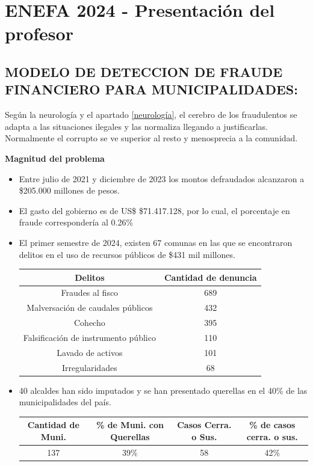 \documentclass[letter,12pt]{article}
\begin{document}
	\section{ENEFA 2024 - Presentación del profesor}
		\subsection{MODELO DE DETECCION DE FRAUDE FINANCIERO PARA MUNICIPALIDADES:}
		Según la neurología y el apartado \ref{neurología}, el cerebro de los fraudulentos se adapta a las situaciones ilegales y las normaliza llegando a justificarlas. Normalmente el corrupto se ve superior al resto y menosprecia a la comunidad.
		
		\textbf{Magnitud del problema}
		\begin{itemize}
			\item Entre julio de 2021 y diciembre de 2023 los montos defraudados  alcanzaron a \$205.000 millones de pesos.
			\item El gasto del gobierno es de US\$ \$71.417.128, por lo cual, el porcentaje en fraude correspondería al 0.26\%
			\item El primer semestre de 2024, existen 67 comunas en las que se encontraron delitos en el uso de recursos públicos de \$431 mil millones.
			\begin{center}
				\begin{tabular}{|c|c|}
					\hline
					Delitos & Cantidad de denuncia\\
					\hline
					Fraudes al fisco & 689\\
					\hline
					Malversación de caudales públicos & 432\\
					\hline
					Cohecho & 395\\
					\hline
					Falsificación de instrumento público & 110\\
					\hline
					Lavado de activos & 101\\
					\hline
					Irregularidades & 68\\
					\hline
				\end{tabular}
			\end{center}
			\item 40 alcaldes han sido imputados y se han presentado querellas en el 40\% de las municipalidades del país.
			\begin{center}
				\begin{tabular}{|c|c|c|c|}
					\hline
					Cantidad de Muni. & \% de Muni. con Querellas  & Casos Cerra. o Sus. &  \% de casos cerra. o sus. \\
					\hline
					137 & 39\% & 58 & 42\% \\
					\hline
				\end{tabular}
			\end{center}
		\end{itemize}
\end{document}
